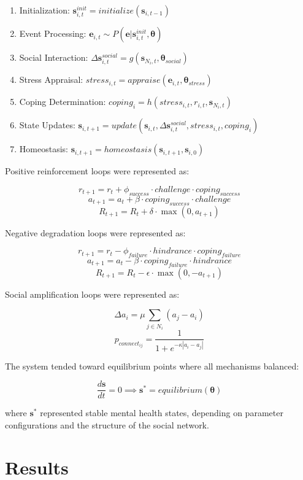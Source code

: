 \documentclass[
  letterpaper,
  DIV=11,
  numbers=noendperiod]{scrartcl}
\providecommand{\tightlist}{%
  \setlength{\itemsep}{0pt}\setlength{\parskip}{0pt}}
\begin{document}
\begin{enumerate}
\def\labelenumi{\arabic{enumi}.}
\tightlist
\item
  Initialization:
  \(\mathbf{s}_{i,t}^{init} = initialize(\mathbf{s}_{i,t-1})\)
\item
  Event Processing:
  \(\mathbf{e}_{i,t} \sim P(\mathbf{e}|\mathbf{s}_{i,t}^{init}, \mathbf{\theta})\)
\item
  Social Interaction:
  \(\Delta \mathbf{s}_{i,t}^{social} = g(\mathbf{s}_{N_i,t}, \mathbf{\theta}_{social})\)
\item
  Stress Appraisal:
  \(stress_{i,t} = appraise(\mathbf{e}_{i,t}, \mathbf{\theta}_{stress})\)
\item
  Coping Determination:
  \(coping_i = h(stress_{i,t}, r_{i,t}, \mathbf{s}_{N_i,t})\)
\item
  State Updates:
  \(\mathbf{s}_{i,t+1} = update(\mathbf{s}_{i,t}, \Delta \mathbf{s}_{i,t}^{social}, stress_{i,t}, coping_i)\)
\item
  Homeostasis:
  \(\mathbf{s}_{i,t+1} = homeostasis(\mathbf{s}_{i,t+1}, \mathbf{s}_{i,0})\)
\end{enumerate}

Positive reinforcement loops were represented as:

\[r_{t+1} = r_t + \phi_{success} \cdot challenge \cdot coping_{success}\]
\[a_{t+1} = a_t + \beta \cdot coping_{success} \cdot challenge\]
\[R_{t+1} = R_t + \delta \cdot \max(0, a_{t+1})\]

Negative degradation loops were represented as:

\[r_{t+1} = r_t - \phi_{failure} \cdot hindrance \cdot coping_{failure}\]
\[a_{t+1} = a_t - \beta \cdot coping_{failure} \cdot hindrance\]
\[R_{t+1} = R_t - \epsilon \cdot \max(0, -a_{t+1})\]

Social amplification loops were represented as:

\[\Delta a_i = \mu \sum_{j \in N_i} (a_j - a_i)\]
\[p_{connect_{ij}} = \frac{1}{1 + e^{-\kappa |a_i - a_j|}}\]

The system tended toward equilibrium points where all mechanisms
balanced:

\[\frac{d\mathbf{s}}{dt} = 0 \implies \mathbf{s}^* = equilibrium(\mathbf{\theta})\]

where \(\mathbf{s}^*\) represented stable mental health states,
depending on parameter configurations and the structure of the social
network.

\section{Results}\label{results}
\end{document}
